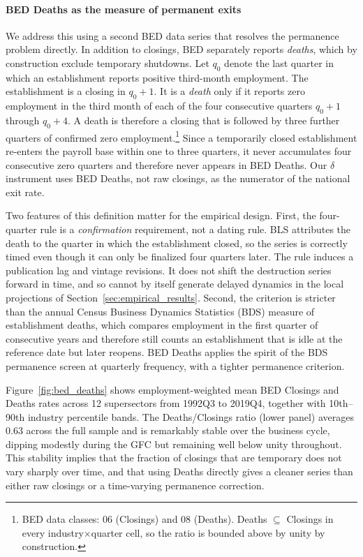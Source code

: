 \documentclass[authoryear, review, 12pt]{elsarticle}
\begin{document}
	\paragraph{BED Deaths as the measure of permanent exits}
	We address this using a second BED data series that resolves the
	permanence problem directly.  In addition to closings, BED separately
	reports \emph{deaths}, which by construction exclude temporary
	shutdowns.  Let $q_0$ denote the last quarter in which an
	establishment reports positive third-month employment.  The
	establishment is a closing in $q_0+1$.  It is a \emph{death} only if
	it reports zero employment in the third month of each of the four
	consecutive quarters $q_0+1$ through $q_0+4$.  A death is therefore a
	closing that is followed by three further quarters of confirmed zero
	employment.\footnote{BED data classes: 06 (Closings) and 08 (Deaths).
	Deaths $\subseteq$ Closings in every industry$\times$quarter cell, so
	the ratio is bounded above by unity by construction.}  Since a
	temporarily closed establishment re-enters the payroll base within one
	to three quarters, it never accumulates four consecutive zero
	quarters and therefore never appears in BED Deaths.  Our $\delta$
	instrument uses BED Deaths, not raw closings, as the numerator of the
	national exit rate.

	Two features of this definition matter for the empirical design.
	First, the four-quarter rule is a \emph{confirmation} requirement, not
	a dating rule.  BLS attributes the death to the quarter in which the
	establishment closed, so the series is correctly timed even though it
	can only be finalized four quarters later.  The rule induces a
	publication lag and vintage revisions.  It does not shift the
	destruction series forward in time, and so cannot by itself generate
	delayed dynamics in the local projections of
	Section~\ref{sec:empirical_results}.  Second, the criterion is
	stricter than the annual Census Business Dynamics Statistics (BDS)
	measure of establishment deaths, which compares employment in the
	first quarter of consecutive years and therefore still counts an
	establishment that is idle at the reference date but later reopens.
	BED Deaths applies the spirit of the BDS permanence screen at
	quarterly frequency, with a tighter permanence criterion.

	Figure~\ref{fig:bed_deaths} shows employment-weighted mean BED Closings
	and Deaths rates across 12 supersectors from 1992Q3 to 2019Q4, together
	with 10th--90th industry percentile bands.  The Deaths/Closings ratio
	(lower panel) averages 0.63 across the full sample and is remarkably
	stable over the business cycle, dipping modestly during the GFC but
	remaining well below unity throughout.  This stability implies that the
	fraction of closings that are temporary does not vary sharply over time,
	and that using Deaths directly gives a cleaner series than either raw
	closings or a time-varying permanence correction.
\end{document}
